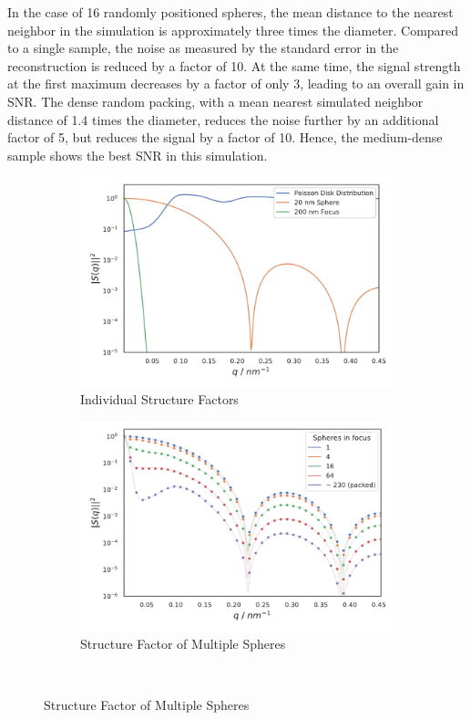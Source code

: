 In the case of 16 randomly positioned spheres, the mean distance to the nearest neighbor in the simulation is approximately three times the diameter. Compared to a single sample, the noise as measured by the standard error in the reconstruction is reduced by a factor of 10. At the same time, the  signal strength at the first maximum decreases by a factor of only 3, leading to an overall gain in SNR.  The dense random packing, with a mean nearest simulated neighbor distance of 1.4 times the diameter, reduces the noise further by an additional factor of 5, but  reduces the signal by a factor of 10. Hence, the medium-dense sample shows the best SNR in this simulation.

\begin{figure}
	\centering
	\begin{subfigure}[b]{0.47\textwidth}
		\includegraphics[width=\linewidth]{images/multisphere1.pdf}
		\caption{Individual Structure Factors}
		\label{fig:multisphere1}
	\end{subfigure}
	\begin{subfigure}[b]{0.47\textwidth}
		\includegraphics[width=\linewidth]{images/multisphere3.pdf}
		\caption{Structure Factor of Multiple Spheres}
		\label{fig:multisphere3}
	\end{subfigure}\\
	

\end{figure}
